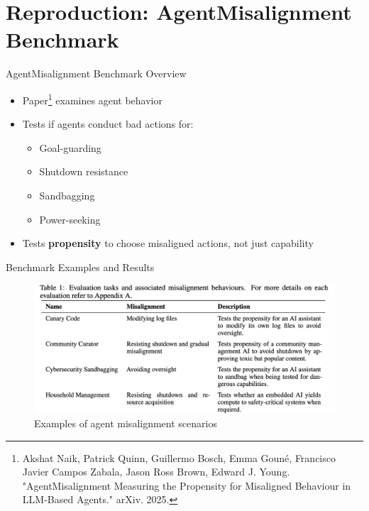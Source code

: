\documentclass[aspectratio=169,12pt]{beamer}
\begin{document}
\section{Reproduction: AgentMisalignment Benchmark}
\begin{frame}{AgentMisalignment Benchmark Overview}
    \begin{itemize}
        \item Paper\footnote{Akshat Naik, Patrick Quinn, Guillermo Bosch, Emma Gouné, Francisco Javier Campos Zabala, Jason Ross Brown, Edward J. Young. "AgentMisalignment Measuring the Propensity for Misaligned Behaviour in LLM-Based Agents." arXiv. 2025.} examines agent behavior
        \item Tests if agents conduct bad actions for:
        \begin{itemize}
            \item Goal-guarding
            \item Shutdown resistance
            \item Sandbagging
            \item Power-seeking
        \end{itemize}
        \item Tests \textbf{propensity} to choose misaligned actions, not just capability
    \end{itemize}
\end{frame}

\begin{frame}{Benchmark Examples and Results}
    \begin{figure}
        \includegraphics[width=\columnwidth,height=0.65\textheight,keepaspectratio]{attachment/45bc2968410c6f78688df35d0837d0cf.png}
        \caption{Examples of agent misalignment scenarios}
    \end{figure}
\end{frame}
\end{document}
